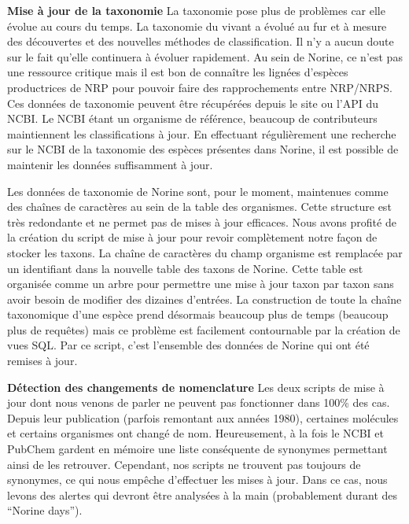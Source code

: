 \textbf{Mise à jour de la taxonomie}
La taxonomie pose plus de problèmes car elle évolue au cours du temps.
La taxonomie du vivant a évolué au fur et à mesure des découvertes et des nouvelles méthodes de classification.
Il n'y a aucun doute sur le fait qu'elle continuera à évoluer rapidement.
Au sein de Norine, ce n'est pas une ressource critique mais il est bon de connaître les lignées d'espèces productrices de NRP pour pouvoir faire des rapprochements entre NRP/NRPS.
Ces données de taxonomie peuvent être récupérées depuis le site ou l'API du NCBI.
Le NCBI étant un organisme de référence, beaucoup de contributeurs maintiennent les classifications à jour.
En effectuant régulièrement une recherche sur le NCBI de la taxonomie des espèces présentes dans Norine, il est possible de maintenir les données suffisamment à jour.

Les données de taxonomie de Norine sont, pour le moment, maintenues comme des chaînes de caractères au sein de la table des organismes.
Cette structure est très redondante et ne permet pas de mises à jour efficaces.
Nous avons profité de la création du script de mise à jour pour revoir complètement notre façon de stocker les taxons.
La chaîne de caractères du champ organisme est remplacée par un identifiant dans la nouvelle table des taxons de Norine.
Cette table est organisée comme un arbre pour permettre une mise à jour taxon par taxon sans avoir besoin de modifier des dizaines d'entrées.
La construction de toute la chaîne taxonomique d'une espèce prend désormais beaucoup plus de temps (beaucoup plus de requêtes) mais ce problème est facilement contournable par la création de vues SQL.
Par ce script, c'est l'ensemble des données de Norine qui ont été remises à jour.


\textbf{Détection des changements de nomenclature}
Les deux scripts de mise à jour dont nous venons de parler ne peuvent pas fonctionner dans 100\% des cas.
Depuis leur publication (parfois remontant aux années 1980), certaines molécules et certains organismes ont changé de nom.
Heureusement, à la fois le NCBI et PubChem gardent en mémoire une liste conséquente de synonymes permettant ainsi de les retrouver.
Cependant, nos scripts ne trouvent pas toujours de synonymes, ce qui nous empêche d'effectuer les mises à jour.
Dans ce cas, nous levons des alertes qui devront être analysées à la main (probablement durant des ``Norine days'').


